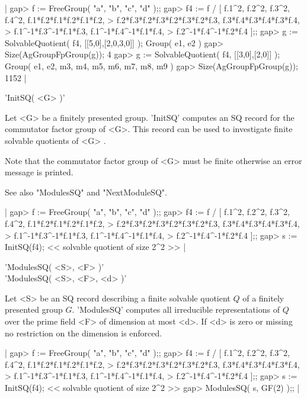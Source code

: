 |    gap> f := FreeGroup( "a", "b", "c", "d" );;
    gap> f4 := f / [ f.1^2, f.2^2, f.3^2, f.4^2, f.1*f.2*f.1*f.2*f.1*f.2,
    >       f.2*f.3*f.2*f.3*f.2*f.3*f.2*f.3, f.3*f.4*f.3*f.4*f.3*f.4,
    >       f.1^-1*f.3^-1*f.1*f.3, f.1^-1*f.4^-1*f.1*f.4,
    >       f.2^-1*f.4^-1*f.2*f.4 ];;
    gap> g := SolvableQuotient( f4, [[5,0],[2,0,3,0]] );
    Group( e1, e2 )
    gap> Size(AgGroupFpGroup(g));
    4
    gap> g := SolvableQuotient( f4, [[3,0],[2,0]] );
    Group( e1, e2, m3, m4, m5, m6, m7, m8, m9 )
    gap> Size(AgGroupFpGroup(g));
    1152 |


'InitSQ( <G> )'

Let <G> be  a finitely presented group.   'InitSQ' computes an SQ  record
for  the commutator  factor  group of  <G>.  This  record can  be used to
investigate finite solvable quotients of <G> .

Note that the commutator factor group of  <G> must be finite otherwise an
error message is printed.

See also "ModulesSQ" and "NextModuleSQ".

|    gap> f := FreeGroup( "a", "b", "c", "d" );;
    gap> f4 := f / [ f.1^2, f.2^2, f.3^2, f.4^2, f.1*f.2*f.1*f.2*f.1*f.2,
    >       f.2*f.3*f.2*f.3*f.2*f.3*f.2*f.3, f.3*f.4*f.3*f.4*f.3*f.4,
    >       f.1^-1*f.3^-1*f.1*f.3, f.1^-1*f.4^-1*f.1*f.4,
    >       f.2^-1*f.4^-1*f.2*f.4 ];;
    gap> s := InitSQ(f4);
    << solvable quotient of size 2^2 >> |


'ModulesSQ( <S>, <F> )' \\
'ModulesSQ( <S>, <F>, <d> )'

Let <S> be an  SQ record describing a  finite solvable quotient $Q$  of a
finitely   presented group  $G$.    'ModulesSQ' computes all  irreducible
representations of $Q$ over the prime field <F> of dimension at most <d>.
If <d> is zero or missing no restriction on the dimension is enforced.

|    gap> f := FreeGroup( "a", "b", "c", "d" );;
    gap> f4 := f / [ f.1^2, f.2^2, f.3^2, f.4^2, f.1*f.2*f.1*f.2*f.1*f.2,
    >       f.2*f.3*f.2*f.3*f.2*f.3*f.2*f.3, f.3*f.4*f.3*f.4*f.3*f.4,
    >       f.1^-1*f.3^-1*f.1*f.3, f.1^-1*f.4^-1*f.1*f.4,
    >       f.2^-1*f.4^-1*f.2*f.4 ];;
    gap> s := InitSQ(f4);
    << solvable quotient of size 2^2 >>
    gap> ModulesSQ( s, GF(2) );; |


